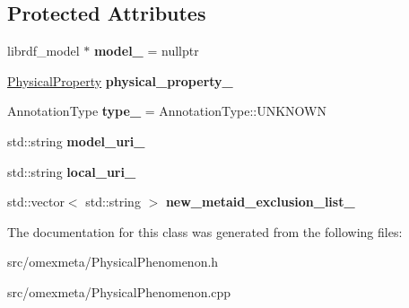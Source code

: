 \subsection*{Protected Attributes}
\begin{DoxyCompactItemize}
\item 
\mbox{\label{classomexmeta_1_1PhysicalPhenomenon_a9de43fc3fd94d3463c7fb9b8f684e78b}} 
librdf\+\_\+model $\ast$ {\bfseries model\+\_\+} = nullptr
\item 
\mbox{\label{classomexmeta_1_1PhysicalPhenomenon_a9e17807d60d9e3f797d6c02ef85cdfc6}} 
\hyperlink{classomexmeta_1_1PhysicalProperty}{Physical\+Property} {\bfseries physical\+\_\+property\+\_\+}
\item 
\mbox{\label{classomexmeta_1_1PhysicalPhenomenon_a74e88adb2099099e411b55cb9aa460a0}} 
Annotation\+Type {\bfseries type\+\_\+} = Annotation\+Type\+::\+U\+N\+K\+N\+O\+WN
\item 
\mbox{\label{classomexmeta_1_1PhysicalPhenomenon_a696cbc4f6490dd55d6bd41c7711cd0ec}} 
std\+::string {\bfseries model\+\_\+uri\+\_\+}
\item 
\mbox{\label{classomexmeta_1_1PhysicalPhenomenon_a114864dfae1f79ce4e3f430b7711516c}} 
std\+::string {\bfseries local\+\_\+uri\+\_\+}
\item 
\mbox{\label{classomexmeta_1_1PhysicalPhenomenon_a710756d611350395539dfa9f7fbf764e}} 
std\+::vector$<$ std\+::string $>$ {\bfseries new\+\_\+metaid\+\_\+exclusion\+\_\+list\+\_\+}
\end{DoxyCompactItemize}


The documentation for this class was generated from the following files\+:\begin{DoxyCompactItemize}
\item 
src/omexmeta/Physical\+Phenomenon.\+h\item 
src/omexmeta/Physical\+Phenomenon.\+cpp\end{DoxyCompactItemize}
